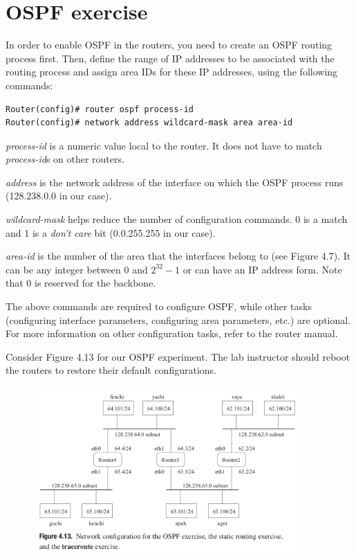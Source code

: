 \documentclass{../UTNetLab}
\begin{document}
\section*{OSPF exercise}
    In order to enable OSPF in the routers, you need to create an OSPF routing process first.
    Then, define the range of IP addresses to be associated with the routing process and assign area IDs for these IP addresses, using the following commands:
    \begin{lstlisting}[language={cisco}, emph={process-id, area-id, address, wildcard-mask}]
Router(config)# router ospf process-id
Router(config)# network address wildcard-mask area area-id
    \end{lstlisting}
    
    \textit{process-id} is a numeric value local to the router.
    It does not have to match \textit{process-id}s on other routers.

    \textit{address} is the network address of the interface on which the OSPF process runs (128.238.0.0 in our case).

    \textit{wildcard-mask} helps reduce the number of configuration commands.
    0 is a match and 1 is a \textit{don’t care} bit (0.0.255.255 in our case).

    \textit{area-id} is the number of the area that the interfaces belong to (see Figure 4.7).
    It can be any integer between 0 and $2^{32} - 1$ or can have an IP address form.
    Note that 0 is reserved for the backbone. 

    The above commands are required to configure OSPF, while other tasks (configuring interface parameters, configuring area parameters, etc.) are optional.
    For more information on other configuration tasks, refer to the router manual. 

    Consider Figure 4.13 for our OSPF experiment.
    The lab instructor should reboot the routers to restore their default configurations.
    \begin{figure}[H]
        \centering
        \includegraphics[width=0.9\textwidth]{img/figure4-13.png}
    \end{figure}
\end{document}
